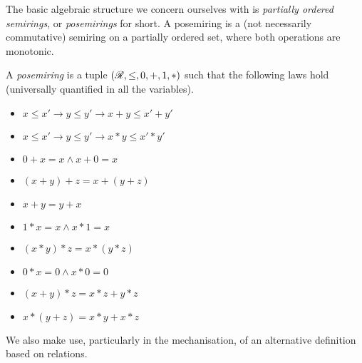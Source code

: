 The basic algebraic structure we concern ourselves with is \emph{partially
ordered semirings}, or \emph{posemirings} for short.
A posemiring is a (not necessarily commutative) semiring on a partially ordered
set, where both operations are monotonic.

\begin{definition}
  A \emph{posemiring} is a tuple $(\mathscr R, \leq, 0, +, 1, *)$ such that the
  following laws hold (universally quantified in all the variables).
  \begin{itemize}
    \item $x \leq x' \to y \leq y' \to x + y \leq x' + y'$
    \item $x \leq x' \to y \leq y' \to x * y \leq x' * y'$
    \item $0 + x = x \land x + 0 = x$
    \item $(x + y) + z = x + (y + z)$
    \item $x + y = y + x$
    \item $1 * x = x \land x * 1 = x$
    \item $(x * y) * z = x * (y * z)$
    \item $0 * x = 0 \land x * 0 = 0$
    \item $(x + y) * z = x * z + y * z$
    \item $x * (y + z) = x * y + x * z$
  \end{itemize}
\end{definition}

We also make use, particularly in the mechanisation, of an alternative
definition based on relations.

